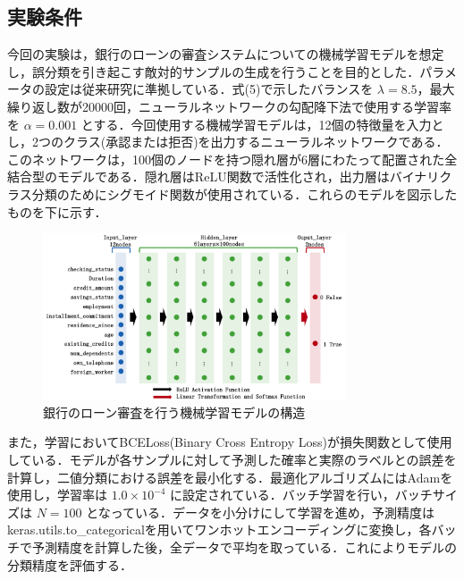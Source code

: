 \subsection{実験条件}
今回の実験は，銀行のローンの審査システムについての機械学習モデルを想定し，誤分類を引き起こす敵対的サンプルの生成を行うことを目的とした．パラメータの設定は従来研究\cite{ballet2019imperceptible}に準拠している．式(5)で示したバランスを $\lambda=8.5$，最大繰り返し数が20000回，ニューラルネットワークの勾配降下法で使用する学習率を $\alpha=0.001$ とする．今回使用する機械学習モデルは，12個の特徴量を入力とし，2つのクラス(承認または拒否)を出力するニューラルネットワークである．このネットワークは，100個のノードを持つ隠れ層が6層にわたって配置された全結合型のモデルである．隠れ層はReLU関数で活性化され，出力層はバイナリクラス分類のためにシグモイド関数が使用されている．これらのモデルを図示したものを下に示す．

\begin{figure}[H]
    \centering
    \includegraphics[width=0.8\textwidth]{images/審査モデル.png}
    \caption{銀行のローン審査を行う機械学習モデルの構造}
    \label{fig:struct_model}
\end{figure}

また，学習においてBCELoss(Binary Cross Entropy Loss)が損失関数として使用している．モデルが各サンプルに対して予測した確率と実際のラベルとの誤差を計算し，二値分類における誤差を最小化する．最適化アルゴリズムにはAdamを使用し，学習率は $1.0 \times 10^{-4}$ に設定されている．バッチ学習を行い，バッチサイズは $N=100$ となっている．データを小分けにして学習を進め，予測精度はkeras.utils.to\_categoricalを用いてワンホットエンコーディングに変換し，各バッチで予測精度を計算した後，全データで平均を取っている．これによりモデルの分類精度を評価する．

